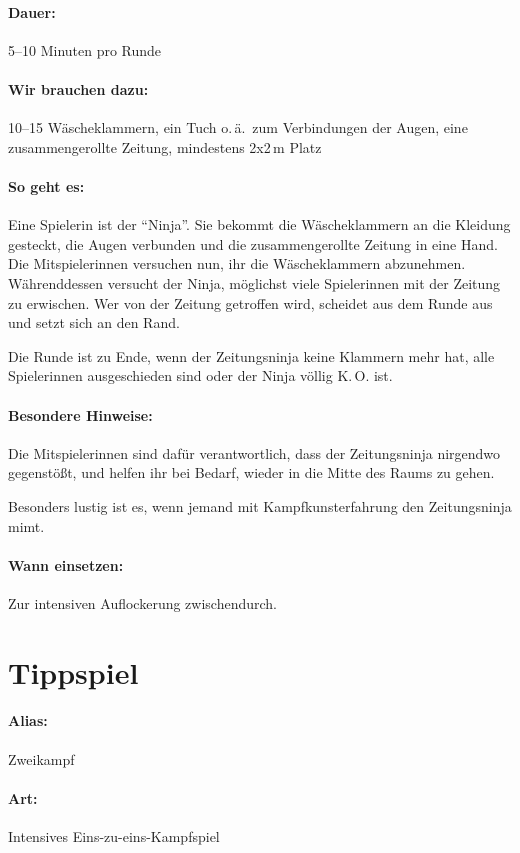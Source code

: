 \paragraph{Dauer:} 5--10 Minuten pro Runde
\paragraph{Wir brauchen dazu:} 10--15 Wäscheklammern, ein Tuch o.\,ä.~zum Verbindungen der Augen, eine zusammengerollte Zeitung, mindestens 2x2\,m Platz
\paragraph{So geht es:} Eine Spielerin ist der "`Ninja"'. Sie bekommt die Wäscheklammern an die Kleidung gesteckt, die Augen verbunden und die zusammengerollte Zeitung in eine Hand. Die Mitspielerinnen versuchen nun, ihr die Wäscheklammern abzunehmen. Währenddessen versucht der Ninja, möglichst viele Spielerinnen mit der Zeitung zu erwischen. Wer von der Zeitung getroffen wird, scheidet aus dem Runde aus und setzt sich an den Rand.

Die Runde ist zu Ende, wenn der Zeitungsninja keine Klammern mehr hat, alle Spielerinnen ausgeschieden sind oder der Ninja völlig K.\,O. ist.

\paragraph{Besondere Hinweise:} Die Mitspielerinnen sind dafür verantwortlich, dass der Zeitungsninja nirgendwo gegenstößt, und helfen ihr bei Bedarf, wieder in die Mitte des Raums zu gehen.

Besonders lustig ist es, wenn jemand mit Kampfkunsterfahrung den Zeitungsninja mimt.

\paragraph{Wann einsetzen:} Zur intensiven Auflockerung zwischendurch.


\section{Tippspiel}
\paragraph{Alias:} Zweikampf
\paragraph{Art:} Intensives Eins-zu-eins-Kampfspiel
